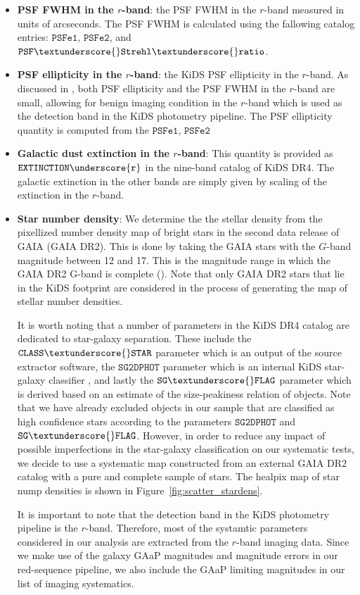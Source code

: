 \documentclass[fleqn,usenatbib,useAMS]{mnras}
\begin{document}
\begin{itemize}
  \item \textbf{PSF FWHM in the $r$-band}: the PSF FWHM in the $r$-band measured in units of arcseconds. The PSF FWHM is calculated using the fallowing catalog entries: $\mathtt{PSFe1}$, $\mathtt{PSFe2}$, and $\mathtt{PSF \textunderscore{} Strehl \textunderscore{} ratio}$.
    
  \item \textbf{PSF ellipticity in the $r$-band}: the KiDS PSF ellipticity in the $r$-band. As discussed in \citet{kuijken2019}, both PSF ellipticity and the PSF FWHM in the $r$-band are small, allowing for benign imaging condition in the $r$-band which is used as the detection band in the KiDS photometry pipeline. 
  The PSF ellipticity quantity is computed from the $\mathtt{PSFe1}$, $\mathtt{PSFe2}$
  
  \item \textbf{Galactic dust extinction in the $r$-band}: This quantity is provided as $\mathtt{EXTINCTION\underscore{r}}$ in the nine-band catalog of KiDS DR4. The galactic extinction in the other bands are simply given by scaling of the extinction in the $r$-band.   
  
  \item \textbf{Star number density}: We determine the the stellar density from the pixellized number density map of bright stars in the second data release of GAIA (GAIA DR2). This is done by taking the GAIA stars with the $G$-band magnitude between 12 and 17. This is the magnitude range in which the GAIA DR2 G-band is complete (\citealt{gaia0,gaia1}). Note that only GAIA DR2 stars that lie in the KiDS footprint are considered in the process of generating the map of stellar number densities. 
  
  It is worth noting that a number of parameters in the KiDS DR4 catalog are dedicated to star-galaxy separation. These include the $\mathtt{CLASS\textunderscore{}STAR}$
  parameter which is an output of the source extractor software, the $\mathtt{SG2DPHOT}$ parameter which is an internal KiDS star-galaxy classifier \citep[e.g.][]{kids_dr3, radovich2017}, and lastly the $\mathtt{SG\textunderscore{}FLAG}$ parameter which is derived based on an estimate of the size-peakiness relation of objects. Note that we have already excluded objects in our sample that are classified as high confidence stars according to the parameters $\mathtt{SG2DPHOT}$ and $\mathtt{SG\textunderscore{} FLAG}$. However, in order to reduce any impact of possible imperfections in the star-galaxy classification on our systematic tests, we decide to use a systematic map constructed from an external GAIA DR2 catalog with a pure and complete sample of stars. The healpix map of star nump densities is shown in Figure~\ref{fig:scatter_stardens}.
 
  It is important to note that the detection band in the KiDS photometry pipeline is the $r$-band. Therefore, most of the systamtic parameters considered in our analysis are extracted from the $r$-band imaging data. Since we make use of the galaxy GAaP magnitudes and magnitude errors in our red-sequence pipeline, we also include the GAaP limiting magnitudes in our list of imaging systematics.  
 
\end{itemize}
\end{document}
